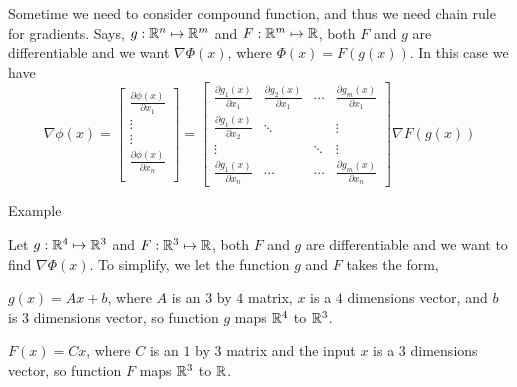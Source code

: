 Sometime  we need to consider compound function, and thus we need chain rule for gradients. Says, $g:\mathbb{R}^{n}\mapsto\mathbb{R}^{m}$ and $F:\mathbb{R}^{m}\mapsto\mathbb{R}$, both $F$ and $g$ are differentiable and we want $\nabla\Phi (x)$, where $\Phi (x)=F(g(x))$. In this case we have
$$
\nabla \phi (x)
=
\left[\begin{matrix}
	\frac{\partial \phi (x)}{\partial x_{1}}\\
	\vdots\\
	\vdots\\
	\frac{\partial \phi (x)}{\partial x_{n}}\\
\end{matrix}\right]
=
\left[\begin{matrix}
	\frac{\partial g_{1}(x)}{\partial x_{1}}&\frac{\partial g_{2}(x)}{\partial x_{1}}&\cdots&\frac{\partial g_{m}(x)}{\partial x_{1}}\\
	\frac{\partial g_{1}(x)}{\partial x_{2}}&\ddots & &\vdots\\
	\vdots& &\ddots &\vdots \\
	\frac{\partial g_{1}(x)}{\partial x_{n}}&\cdots&\cdots&\frac{\partial g_{m}(x)}{\partial x_{n}}
\end{matrix}\right]
\nabla F\left(g(x)\right)
$$

Example 

Let $g:\mathbb{R}^{4}\mapsto\mathbb{R}^{3}$ and $F:\mathbb{R}^{3}\mapsto\mathbb{R}$, both $F$ and $g$ are differentiable and we want to find $\nabla\Phi (x)$. To simplify, we let the function $g$ and $F$ takes the form,

$g(x)=Ax+b$, where $A$ is an $3$ by $4$ matrix, $x$ is a $4$ dimensions vector,  and $b$ is $3$ dimensions vector, so function $g$ maps $\mathbb{R}^{4}$ to $\mathbb{R}^{3}$.
 

$F(x)=Cx$, where $C$ is an $1$ by $3$ matrix and the input $x$ is a $3$ dimensions vector, so function $F$ maps $\mathbb{R}^{3}$ to $\mathbb{R}$.

